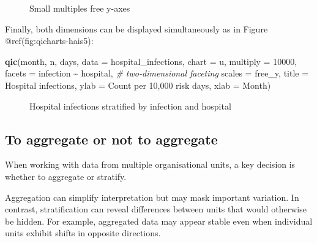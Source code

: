 \documentclass[
]{book}
\makeatletter
\newenvironment{Shaded}{\begin{snugshade}}{\end{snugshade}}
\newcommand{\AttributeTok}[1]{\textcolor[rgb]{0.13,0.29,0.53}{#1}}
\newcommand{\CommentTok}[1]{\textcolor[rgb]{0.56,0.35,0.01}{\textit{#1}}}
\newcommand{\DecValTok}[1]{\textcolor[rgb]{0.00,0.00,0.81}{#1}}
\newcommand{\FunctionTok}[1]{\textcolor[rgb]{0.13,0.29,0.53}{\textbf{#1}}}
\newcommand{\NormalTok}[1]{#1}
\newcommand{\SpecialCharTok}[1]{\textcolor[rgb]{0.81,0.36,0.00}{\textbf{#1}}}
\newcommand{\StringTok}[1]{\textcolor[rgb]{0.31,0.60,0.02}{#1}}
\newcommand*\pandocbounded[1]{%
  \sbox\pandoc@box{#1}%
  \Gscale@div\@tempa{\textheight}{\dimexpr\ht\pandoc@box+\dp\pandoc@box\relax}%
  \Gscale@div\@tempb{\linewidth}{\wd\pandoc@box}%
  \ifdim\@tempb\p@<\@tempa\p@\let\@tempa\@tempb\fi%
  \ifdim\@tempa\p@<\p@\scalebox{\@tempa}{\usebox\pandoc@box}%
  \else\usebox{\pandoc@box}%
  \fi%
}
\makeatother
\begin{document}
\begin{figure}
\centering
\pandocbounded{}
\caption{Small multiples free y-axes}
\end{figure}

Finally, both dimensions can be displayed simultaneously as in Figure
@ref(fig:qicharts-hais5):

\begin{Shaded}
\begin{Highlighting}[]
\FunctionTok{qic}\NormalTok{(month, n, days, }
    \AttributeTok{data     =}\NormalTok{ hospital\_infections,}
    \AttributeTok{chart    =} \StringTok{\textquotesingle{}u\textquotesingle{}}\NormalTok{,}
    \AttributeTok{multiply =} \DecValTok{10000}\NormalTok{,}
    \AttributeTok{facets   =}\NormalTok{ infection }\SpecialCharTok{\textasciitilde{}}\NormalTok{ hospital,         }\CommentTok{\# two{-}dimensional faceting}
    \AttributeTok{scales   =} \StringTok{\textquotesingle{}free\_y\textquotesingle{}}\NormalTok{,}
    \AttributeTok{title    =} \StringTok{\textquotesingle{}Hospital infections\textquotesingle{}}\NormalTok{,}
    \AttributeTok{ylab     =} \StringTok{\textquotesingle{}Count per 10,000 risk days\textquotesingle{}}\NormalTok{,}
    \AttributeTok{xlab     =} \StringTok{\textquotesingle{}Month\textquotesingle{}}\NormalTok{)}
\end{Highlighting}
\end{Shaded}

\begin{figure}
\centering
\pandocbounded{}
\caption{Hospital infections stratified by infection and hospital}
\end{figure}

\subsection{To aggregate or not to
aggregate}\label{to-aggregate-or-not-to-aggregate}

When working with data from multiple organisational units, a key
decision is whether to aggregate or stratify.

Aggregation can simplify interpretation but may mask important
variation. In contrast, stratification can reveal differences between
units that would otherwise be hidden. For example, aggregated data may
appear stable even when individual units exhibit shifts in opposite
directions.
\end{document}
